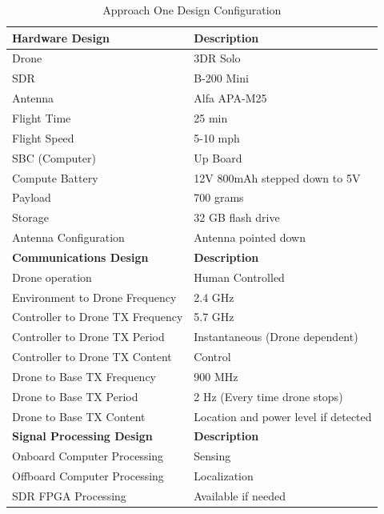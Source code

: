 \begin{table}[ht]
\centering
\caption{Approach One Design Configuration}
\label{table:approach_one}
\begin{tabular}{|l|l|}
  	\hline 	\textbf{Hardware Design} 			& \textbf{Description} 						\\ \hline
  	  		Drone  								& 3DR Solo									\\
  	        SDR    								& B-200 Mini 								\\
  	     	Antenna 							& Alfa APA-M25 								\\
  	     	Flight Time 						& 25 min 									\\
  	   		Flight Speed 						& 5-10 mph 									\\
  	   		SBC (Computer)  					& Up Board 									\\
  	        Compute Battery 					& 12V 800mAh stepped down to 5V				\\
  	     	Payload 							& 700 grams 								\\
  	     	Storage  							& 32 GB flash drive 						\\
  	        Antenna Configuration 				& Antenna pointed down 						\\
  	\hline  \textbf{Communications Design} 		& \textbf{Description} 						\\ \hline
  	     	Drone operation 					& Human Controlled 							\\
  	   		Environment to Drone Frequency 		& 2.4 GHz									\\
  	   		Controller to Drone TX Frequency  	& 5.7 GHz 									\\
  	        Controller to Drone TX Period 		& Instantaneous (Drone dependent)			\\
  	     	Controller to Drone TX Content 		& Control 	 								\\
  	     	Drone to Base TX Frequency  		& 900 MHz 									\\
  	        Drone to Base TX Period 			& 2 Hz (Every time drone stops) 			\\
  	     	Drone to Base TX Content 			& Location and power level if detected		\\
  	\hline  \textbf{Signal Processing Design} 	& \textbf{Description} 						\\ \hline
  	     	Onboard Computer Processing 		& Sensing 									\\
  	   		Offboard Computer Processing 		& Localization								\\
  	   		SDR FPGA Processing  				& Available if needed						\\

\end{tabular}
\end{table}
